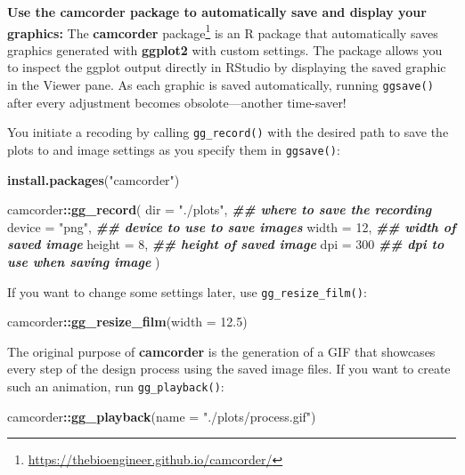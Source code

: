 \documentclass[
]{krantz}
\makeatletter
\newenvironment{Shaded}{\begin{snugshade}}{\end{snugshade}}
\newcommand{\AttributeTok}[1]{\textcolor[rgb]{0.27,0.27,0.27}{#1}}
\newcommand{\DecValTok}[1]{\textcolor[rgb]{0.06,0.06,0.06}{#1}}
\newcommand{\DocumentationTok}[1]{\textcolor[rgb]{0.37,0.37,0.37}{\textbf{\textit{#1}}}}
\newcommand{\FloatTok}[1]{\textcolor[rgb]{0.06,0.06,0.06}{#1}}
\newcommand{\FunctionTok}[1]{\textcolor[rgb]{0.27,0.27,0.27}{\textbf{#1}}}
\newcommand{\NormalTok}[1]{#1}
\newcommand{\SpecialCharTok}[1]{\textcolor[rgb]{0.43,0.43,0.43}{\textbf{#1}}}
\newcommand{\StringTok}[1]{\textcolor[rgb]{0.5,0.5,0.5}{#1}}
\renewcommand{\href}[2]{#2\footnote{\url{#1}}}
\newenvironment{kframe}{%
\medskip{}
\setlength{\fboxsep}{.8em}
 \def\at@end@of@kframe{}%
 \ifinner\ifhmode%
  \def\at@end@of@kframe{\end{minipage}}%
  \begin{minipage}{\columnwidth}%
 \fi\fi%
 \def\FrameCommand##1{\hskip\@totalleftmargin \hskip-\fboxsep
 \colorbox{shadecolor}{##1}\hskip-\fboxsep
     \hskip-\linewidth \hskip-\@totalleftmargin \hskip\columnwidth}%
 \MakeFramed {\advance\hsize-\width
   \@totalleftmargin\z@ \linewidth\hsize
   \@setminipage}}%
 {\par\unskip\endMakeFramed%
 \at@end@of@kframe}
\renewenvironment{Shaded}{\begin{kframe}}{\end{kframe}}
\makeatother
\begin{document}
\textbf{Use the camcorder package to automatically save and display your graphics:} The \href{https://thebioengineer.github.io/camcorder/}{\textbf{camcorder} package} \citep{camcorder} is an R package that automatically saves graphics generated with \textbf{ggplot2} with custom settings. The package allows you to inspect the ggplot output directly in RStudio by displaying the saved graphic in the Viewer pane. As each graphic is saved automatically, running \texttt{ggsave()} after every adjustment becomes obsolote---another time-saver!

You initiate a recoding by calling \texttt{gg\_record()} with the desired path to save the plots to and image settings as you specify them in \texttt{ggsave()}:

\begin{Shaded}
\begin{Highlighting}[]
\FunctionTok{install.packages}\NormalTok{(}\StringTok{"camcorder"}\NormalTok{)}

\NormalTok{camcorder}\SpecialCharTok{::}\FunctionTok{gg\_record}\NormalTok{(}
  \AttributeTok{dir =} \StringTok{"./plots"}\NormalTok{, }\DocumentationTok{\#\# where to save the recording}
  \AttributeTok{device =} \StringTok{"png"}\NormalTok{,  }\DocumentationTok{\#\# device to use to save images}
  \AttributeTok{width =} \DecValTok{12}\NormalTok{,      }\DocumentationTok{\#\# width of saved image}
  \AttributeTok{height =} \DecValTok{8}\NormalTok{,      }\DocumentationTok{\#\# height of saved image}
  \AttributeTok{dpi =} \DecValTok{300}        \DocumentationTok{\#\# dpi to use when saving image}
\NormalTok{)}
\end{Highlighting}
\end{Shaded}

If you want to change some settings later, use \texttt{gg\_resize\_film()}:

\begin{Shaded}
\begin{Highlighting}[]
\NormalTok{camcorder}\SpecialCharTok{::}\FunctionTok{gg\_resize\_film}\NormalTok{(}\AttributeTok{width =} \FloatTok{12.5}\NormalTok{)}
\end{Highlighting}
\end{Shaded}

The original purpose of \textbf{camcorder} is the generation of a GIF that showcases every step of the design process using the saved image files. If you want to create such an animation, run \texttt{gg\_playback()}:

\begin{Shaded}
\begin{Highlighting}[]
\NormalTok{camcorder}\SpecialCharTok{::}\FunctionTok{gg\_playback}\NormalTok{(}\AttributeTok{name =} \StringTok{"./plots/process.gif"}\NormalTok{)}
\end{Highlighting}
\end{Shaded}
\end{document}
